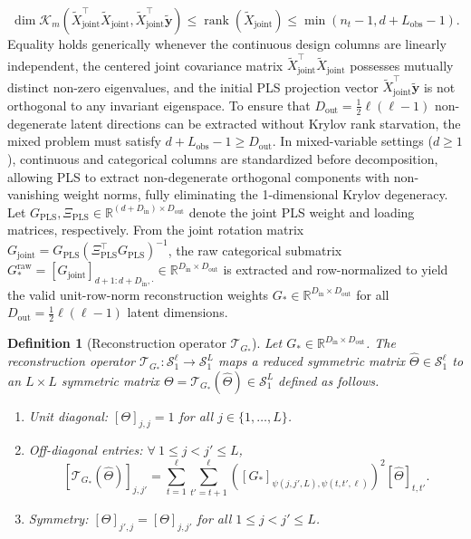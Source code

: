 \documentclass[default,sn-mathphys,Numbered]{sn-jnl}
\theoremstyle{thmstyleone}
\theoremstyle{thmstylethree}
\newtheorem{definition}{Definition}
\theoremstyle{thmstyletwo}
\newcommand{\inp}{\text{in}}
\newcommand{\outp}{\text{out}}
\newcommand{\rank}{\operatorname{rank}}
\begin{document}
\begin{equation}
\label{eq:krylov_bound}
\dim \mathcal{K}_m(\tilde{X}_{\mathrm{joint}}^\top \tilde{X}_{\mathrm{joint}}, \tilde{X}_{\mathrm{joint}}^\top \tilde{\bm{y}}) \le \rank(\tilde{X}_{\mathrm{joint}}) \le \min(n_t - 1, d + L_{\mathrm{obs}} - 1).
\end{equation}
    Equality holds generically whenever the continuous design columns are linearly independent, the centered joint covariance matrix $\tilde{X}_{\mathrm{joint}}^\top \tilde{X}_{\mathrm{joint}}$ possesses mutually distinct non-zero eigenvalues, and the initial PLS projection vector $\tilde{X}_{\mathrm{joint}}^\top \tilde{\bm{y}}$ is not orthogonal to any invariant eigenspace. To ensure that $D_{\outp} = \frac{1}{2}\ell(\ell-1)$ non-degenerate latent directions can be extracted without Krylov rank starvation, the mixed problem must satisfy $d + L_{\mathrm{obs}} - 1 \ge D_{\outp}$. 
    In mixed-variable settings ($d \ge 1$), continuous and categorical columns are standardized before decomposition, allowing PLS to extract non-degenerate orthogonal components with non-vanishing weight norms, fully eliminating the 1-dimensional Krylov degeneracy.
    Let $G_{\mathrm{PLS}}, \Xi_{\mathrm{PLS}} \in \mathbb{R}^{(d+D_{\inp}) \times D_{\outp}}$ denote the joint PLS weight and loading matrices, respectively. From the joint rotation matrix $G_{\mathrm{joint}} = G_{\mathrm{PLS}}(\Xi_{\mathrm{PLS}}^\top G_{\mathrm{PLS}})^{-1}$, the raw categorical submatrix $G_*^{\mathrm{raw}} = [G_{\mathrm{joint}}]_{d+1:d+D_{\inp}, \cdot} \in \mathbb{R}^{D_{\inp} \times D_{\outp}}$ is extracted and row-normalized to yield the valid unit-row-norm reconstruction weights $G_* \in \mathbb{R}^{D_{\inp} \times D_{\outp}}$ for all $D_{\outp} = \frac{1}{2}\ell(\ell-1)$ latent dimensions.

  
\begin{definition}[Reconstruction operator $\mathcal{T}_{G_*}$]
\label{def:operator}
Let $G_* \in \mathbb{R}^{D_{\inp} \times D_{\outp}}$. The reconstruction operator $\mathcal{T}_{G_*} : \mathcal{S}_1^\ell \to \mathcal{S}_1^L$ maps a reduced symmetric matrix $\hat{\Theta} \in \mathcal{S}_1^\ell$ to an $L \times L$ symmetric matrix $\Theta = \mathcal{T}_{G_*}(\hat{\Theta}) \in \mathcal{S}_1^L$ defined as follows.
\begin{enumerate}
    \item Unit diagonal: $[\Theta]_{j, j} = 1$ for all $j \in \{1, \ldots, L\}$.
    \item Off-diagonal entries: $\forall \ 1 \le j < j' \le L$,
    \begin{equation}
    \label{eq:recon_formula}
    [\mathcal{T}_{G_*}(\hat{\Theta})]_{j, j'} = \sum_{t=1}^{\ell} \sum_{t'=t+1}^{\ell} \left( [G_*]_{\psi(j,j',L), \psi(t,t',\ell)} \right)^2 [\hat{\Theta}]_{t, t'}.
    \end{equation}
    \item Symmetry: $[\Theta]_{j', j} = [\Theta]_{j, j'}$ for all $1 \le j < j' \le L$.
\end{enumerate}
\end{definition}
\end{document}
